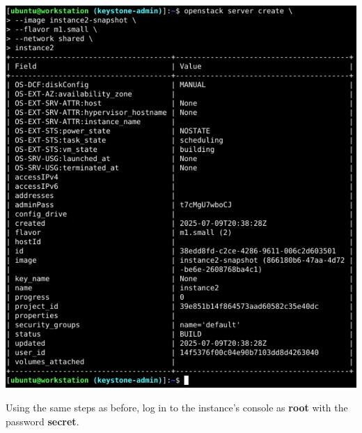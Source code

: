 \documentclass[letterpaper, 12pt]{article}
\begin{document}
\begin{enumerate}
\begin{labstep}
        \begin{center}
            \includegraphics[width=\linewidth]{images/part2/step14.png}
        \end{center}
    \end{labstep}

    \begin{labstep}
        Using the same steps as before, log in to the instance's console as \textbf{root} with the password \textbf{secret}.


\end{labstep}
\end{enumerate}
\end{document}
